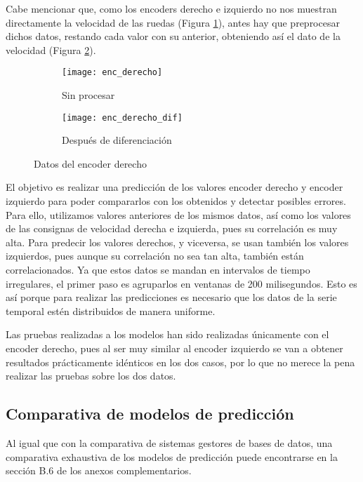 Cabe mencionar que, como los encoders derecho e izquierdo no nos muestran directamente la velocidad de las 
ruedas (Figura \ref{fig:datos_enc_derecho_sp}), antes hay que preprocesar dichos datos, restando cada valor con su anterior, obteniendo así el dato de la 
velocidad (Figura \ref{fig:datos_enc_derecho_dif}).

\begin{figure}[H]
    \centering
    \begin{subfigure}[b]{0.45\textwidth}
        \centering
        \texttt{[image: enc\_derecho]}
        \caption{Sin procesar}
        \label{fig:datos_enc_derecho_sp}
    \end{subfigure}
    \hfill
    \begin{subfigure}[b]{0.45\textwidth}
        \centering
        \texttt{[image: enc\_derecho\_dif]}
        \caption{Después de diferenciación}
        \label{fig:datos_enc_derecho_dif}
    \end{subfigure}
    \caption{Datos del encoder derecho}
    \label{fig:datos_enc_derecho}
\end{figure}

El objetivo es realizar una predicción de los valores encoder derecho y encoder izquierdo para poder 
compararlos con los obtenidos y detectar posibles errores. Para ello, utilizamos valores anteriores de los 
mismos datos, así como los valores de las consignas de velocidad derecha e izquierda, pues su correlación 
es muy alta. Para predecir los valores derechos, y viceversa, se usan también los valores izquierdos, pues aunque su 
correlación no sea tan alta, también están correlacionados.
Ya que estos datos se mandan en intervalos de tiempo irregulares, el primer paso es agruparlos en ventanas de 200 milisegundos. 
Esto es así porque para realizar las predicciones es necesario que los datos de la serie temporal estén distribuidos 
de manera uniforme.

Las pruebas realizadas a los modelos han sido realizadas únicamente con el encoder derecho, pues al ser muy similar 
al encoder izquierdo se van a obtener resultados prácticamente idénticos en los dos casos, por lo que no merece 
la pena realizar las pruebas sobre los dos datos.

\subsection{Comparativa de modelos de predicción}

Al igual que con la comparativa de sistemas gestores de bases de datos, una comparativa exhaustiva de los modelos 
de predicción puede encontrarse en la sección B.6 de los anexos complementarios.

